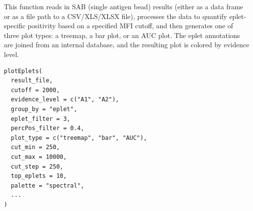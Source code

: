 \documentclass[letterpaper]{book}
\begin{document}
%
\begin{Description}
This function reads in SAB (single antigen bead) results (either as a data frame or
as a file path to a CSV/XLS/XLSX file), processes the data to quantify eplet-specific
positivity based on a specified MFI cutoff, and then generates one of three plot types:
a treemap, a bar plot, or an AUC plot. The eplet annotations are joined from an internal
database, and the resulting plot is colored by evidence level.
\end{Description}
%
\begin{Usage}
\begin{verbatim}
plotEplets(
  result_file,
  cutoff = 2000,
  evidence_level = c("A1", "A2"),
  group_by = "eplet",
  eplet_filter = 3,
  percPos_filter = 0.4,
  plot_type = c("treemap", "bar", "AUC"),
  cut_min = 250,
  cut_max = 10000,
  cut_step = 250,
  top_eplets = 10,
  palette = "spectral",
  ...
)
\end{verbatim}
\end{Usage}
%
\end{document}
